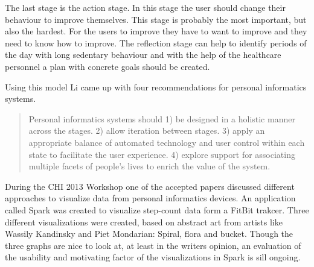 The last stage is the action stage. In this stage the user should change their behaviour to improve themselves. This stage is probably the most important, but also the hardest. For the users to improve they have to want to improve and they need to know how to improve. The reflection stage can help to identify periods of the day with long sedentary behaviour and with the help of the healthcare personnel a plan with concrete goals should be created. 

Using this model Li %
came up with four recommendations for personal informatics systems. 
\begin{quote}
	Personal informatics systems should
	1) be designed in a holistic manner across the stages.
	2) allow iteration between stages.
	3) apply an appropriate balance of automated technology and user control within each state to facilitate the user experience.
	4) explore support for associating multiple facets of people's lives to enrich the value of the system.
\end{quote}


During the CHI 2013 Workshop \cite{chi2013} one of the accepted papers discussed different approaches to visualize data from personal informatics devices. %
An application called Spark was created to visualize step-count data form a FitBit trakcer. %
Three different visualizations were created, based on abstract art from artists like Wassily Kandinsky and Piet Mondarian: Spiral, flora and bucket. %
Though the three graphs are nice to look at, at least in the writers opinion, an evaluation of the usability and motivating factor of the visualizations in Spark is sill ongoing. 
